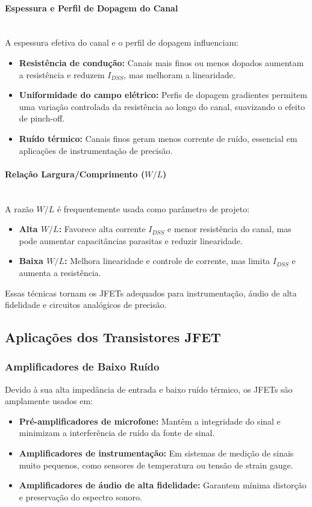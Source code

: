 \documentclass[12pt]{article}
\newcommand{\subsubsubsection}[1]{%
  \paragraph{#1}\mbox{}\\
}
\begin{document}
\subsubsubsection{Espessura e Perfil de Dopagem do Canal}

A espessura efetiva do canal e o perfil de dopagem influenciam:

\begin{itemize}
    \item \textbf{Resistência de condução:} Canais mais finos ou menos dopados aumentam a resistência e reduzem \(I_{DSS}\), mas melhoram a linearidade.
    
    \item \textbf{Uniformidade do campo elétrico:} Perfis de dopagem gradientes permitem uma variação controlada da resistência ao longo do canal, suavizando o efeito de pinch-off.
    
    \item \textbf{Ruído térmico:} Canais finos geram menos corrente de ruído, essencial em aplicações de instrumentação de precisão.
\end{itemize}

\subsubsubsection{Relação Largura/Comprimento (\(W/L\))}

A razão \(W/L\) é frequentemente usada como parâmetro de projeto:

\begin{itemize}
    \item \textbf{Alta \(W/L\):} Favorece alta corrente \(I_{DSS}\) e menor resistência do canal, mas pode aumentar capacitâncias parasitas e reduzir linearidade.
    
    \item \textbf{Baixa \(W/L\):} Melhora linearidade e controle de corrente, mas limita \(I_{DSS}\) e aumenta a resistência.
\end{itemize}

Essas técnicas tornam os JFETs adequados para instrumentação, áudio de alta fidelidade e circuitos analógicos de precisão.

\subsection{Aplicações dos Transistores JFET}

\subsubsection{Amplificadores de Baixo Ruído}

Devido à sua alta impedância de entrada e baixo ruído térmico, os JFETs são amplamente usados em:

\begin{itemize}
    \item \textbf{Pré-amplificadores de microfone:} Mantêm a integridade do sinal e minimizam a interferência de ruído da fonte de sinal.
    
    \item \textbf{Amplificadores de instrumentação:} Em sistemas de medição de sinais muito pequenos, como sensores de temperatura ou tensão de strain gauge.
    
    \item \textbf{Amplificadores de áudio de alta fidelidade:} Garantem mínima distorção e preservação do espectro sonoro.
\end{itemize}
\end{document}
